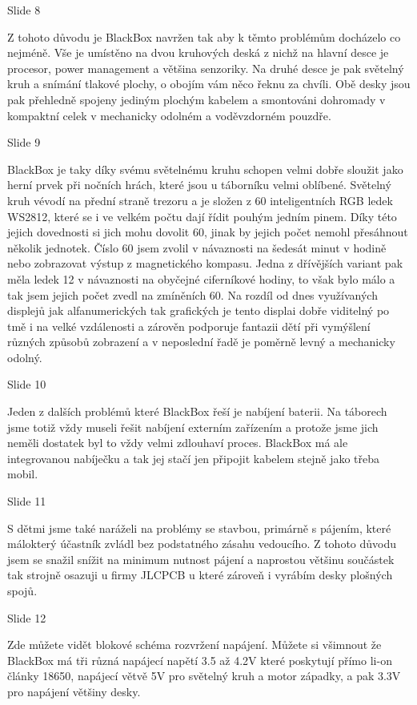 Slide 8

Z tohoto důvodu je BlackBox navržen tak aby k těmto problémům docházelo co nejméně. 
Vše je umístěno na dvou kruhových deská z nichž na hlavní desce je procesor, power management a většina
senzoriky. Na druhé desce je pak světelný kruh a snímání tlakové plochy, o obojím vám něco řeknu za chvíli.
Obě desky jsou pak přehledně spojeny jediným plochým kabelem a smontováni dohromady v kompaktní celek 
v mechanicky odolném a voděvzdorném pouzdře. %

Slide 9

BlackBox je taky díky svému světelnému kruhu schopen velmi dobře sloužit jako herní prvek při nočních hrách,
které jsou u táborníku velmi oblíbené.
Světelný kruh vévodí na přední straně trezoru a je složen z 60 inteligentních RGB ledek WS2812, které 
se i ve velkém počtu dají řídit pouhým jedním pinem. Díky této jejich dovednosti si jich mohu dovolit 60,
jinak by jejich počet nemohl přesáhnout několik jednotek. Číslo 60 jsem zvolil v návaznosti na šedesát 
minut v hodině nebo zobrazovat výstup z magnetického kompasu. Jedna z dřívějších variant pak měla ledek 12 v návaznosti 
na obyčejné ciferníkové hodiny,
to však bylo málo a tak jsem jejich počet zvedl na zmíněních 60.
Na rozdíl od dnes využívaných displejů jak alfanumerických tak grafických je tento displai dobře viditelný po tmě i na velké vzdálenosti 
a zárověn podporuje fantazii dětí při vymýšlení různých způsobů zobrazení a v neposlední řadě je poměrně levný a mechanicky odolný. %

Slide 10

Jeden z dalších problémů které BlackBox řeší je nabíjení baterii. Na táborech jsme totiž vždy museli
řešit nabíjení externím zařízením a protože jsme jich neměli dostatek byl to vždy velmi zdlouhaví proces.
BlackBox má ale integrovanou nabíječku a tak jej stačí jen připojit kabelem stejně jako třeba mobil.

Slide 11

S dětmi jsme také naráželi na problémy se stavbou, primárně s pájením, které málokterý 
účastník zvládl bez podstatného zásahu vedoucího. Z tohoto důvodu jsem se snažil snížit na minimum 
nutnost pájení a naprostou většinu součástek tak strojně osazuji u firmy JLCPCB u které zároveň i vyrábím 
desky plošných spojů.

Slide 12

Zde můžete vidět blokové schéma rozvržení napájení.
Můžete si všimnout že BlackBox má tři různá napájecí napětí 3.5 až 4.2V které poskytují přímo li-on články 18650, 
napájecí větvě 5V pro světelný kruh a motor západky, a pak 3.3V pro napájení většiny desky.

